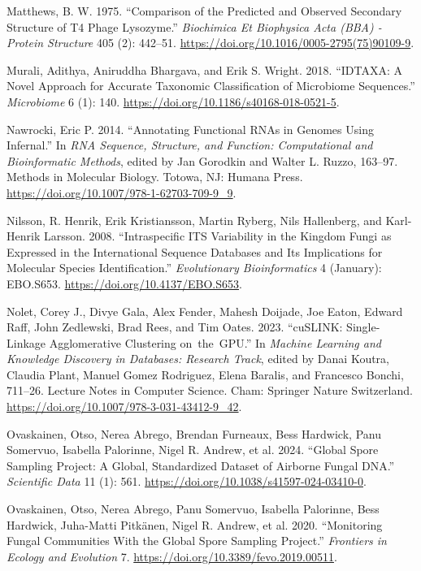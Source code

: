 \documentclass[
]{article}
\newlength{\cslhangindent}
\newenvironment{CSLReferences}[2] %
 {\begin{list}{}{%
  \setlength{\itemindent}{0pt}
  \setlength{\leftmargin}{0pt}
  \setlength{\parsep}{0pt}
  \ifodd #1
   \setlength{\leftmargin}{\cslhangindent}
   \setlength{\itemindent}{-1\cslhangindent}
  \fi
  \setlength{\itemsep}{#2\baselineskip}}}
 {\end{list}}
\begin{document}
\begin{CSLReferences}{1}{0}
Matthews, B. W. 1975. {``Comparison of the Predicted and Observed Secondary Structure of {T4} Phage Lysozyme.''} \emph{Biochimica Et Biophysica Acta (BBA) - Protein Structure} 405 (2): 442--51. \url{https://doi.org/10.1016/0005-2795(75)90109-9}.

Murali, Adithya, Aniruddha Bhargava, and Erik S. Wright. 2018. {``{IDTAXA}: A Novel Approach for Accurate Taxonomic Classification of Microbiome Sequences.''} \emph{Microbiome} 6 (1): 140. \url{https://doi.org/10.1186/s40168-018-0521-5}.

Nawrocki, Eric P. 2014. {``Annotating {Functional RNAs} in {Genomes Using Infernal}.''} In \emph{{RNA Sequence}, {Structure}, and {Function}: {Computational} and {Bioinformatic Methods}}, edited by Jan Gorodkin and Walter L. Ruzzo, 163--97. Methods in {Molecular Biology}. Totowa, NJ: Humana Press. \url{https://doi.org/10.1007/978-1-62703-709-9_9}.

Nilsson, R. Henrik, Erik Kristiansson, Martin Ryberg, Nils Hallenberg, and Karl-Henrik Larsson. 2008. {``Intraspecific {ITS Variability} in the {Kingdom Fungi} as {Expressed} in the {International Sequence Databases} and {Its Implications} for {Molecular Species Identification}.''} \emph{Evolutionary Bioinformatics} 4 (January): EBO.S653. \url{https://doi.org/10.4137/EBO.S653}.

Nolet, Corey J., Divye Gala, Alex Fender, Mahesh Doijade, Joe Eaton, Edward Raff, John Zedlewski, Brad Rees, and Tim Oates. 2023. {``{cuSLINK}: {Single-Linkage Agglomerative Clustering} on~the~{GPU}.''} In \emph{Machine {Learning} and {Knowledge Discovery} in {Databases}: {Research Track}}, edited by Danai Koutra, Claudia Plant, Manuel Gomez Rodriguez, Elena Baralis, and Francesco Bonchi, 711--26. Lecture {Notes} in {Computer Science}. Cham: Springer Nature Switzerland. \url{https://doi.org/10.1007/978-3-031-43412-9_42}.

Ovaskainen, Otso, Nerea Abrego, Brendan Furneaux, Bess Hardwick, Panu Somervuo, Isabella Palorinne, Nigel R. Andrew, et al. 2024. {``Global {Spore Sampling Project}: {A} Global, Standardized Dataset of Airborne Fungal {DNA}.''} \emph{Scientific Data} 11 (1): 561. \url{https://doi.org/10.1038/s41597-024-03410-0}.

Ovaskainen, Otso, Nerea Abrego, Panu Somervuo, Isabella Palorinne, Bess Hardwick, Juha-Matti Pitkänen, Nigel R. Andrew, et al. 2020. {``Monitoring {Fungal Communities With} the {Global Spore Sampling Project}.''} \emph{Frontiers in Ecology and Evolution} 7. \url{https://doi.org/10.3389/fevo.2019.00511}.


\end{CSLReferences}
\end{document}
